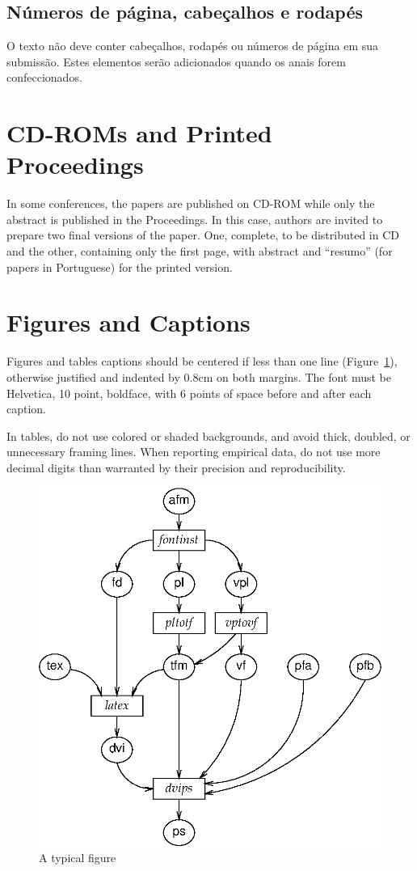 \documentclass[12pt]{article}
\begin{document}
\subsection{Números de página, cabeçalhos e rodapés}

O texto não deve conter cabeçalhos, rodapés ou números de página em sua submissão.
Estes elementos serão adicionados quando os anais forem
confeccionados.


\section{CD-ROMs and Printed Proceedings}

In some conferences, the papers are published on CD-ROM while only the
abstract is published in the Proceedings. In this case, authors are
invited to prepare two final versions of the paper. One, complete, to
be distributed in CD and the other, containing only the first page,
with abstract and ``resumo'' (for papers in Portuguese) for the
printed version.

\section{Figures and Captions}

Figures and tables captions should be centered if less than one line
(Figure~\ref{fig:exampleFig}), otherwise justified and indented by
0.8cm on both margins. The font must be Helvetica, 10 point, boldface,
with 6 points of space before and after each caption.

In tables, do not use colored or shaded backgrounds, and avoid thick,
doubled, or unnecessary framing lines. When reporting empirical data,
do not use more decimal digits than warranted by their precision and
reproducibility.


\begin{figure}
\centering
\includegraphics[width=.5\textwidth]{exampleFig.eps}
\caption{A typical figure}
\label{fig:exampleFig}
\end{figure}
\end{document}
